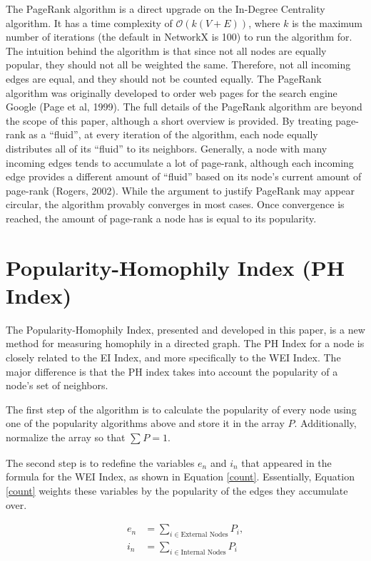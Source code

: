 \documentclass{article}
\begin{document}
The PageRank algorithm is a direct upgrade on the In-Degree Centrality
algorithm. It has a time complexity of
\(\mathcal{O}\left( k(V + E) \right)\), where $k$ is the maximum
number of iterations (the default in NetworkX is 100) to run the
algorithm for. The intuition behind the algorithm is that since not all
nodes are equally popular, they should not all be weighted the same.
Therefore, not all incoming edges are equal, and they should not be
counted equally. The PageRank algorithm was originally developed to
order web pages for the search engine Google (Page et al, 1999). The
full details of the PageRank algorithm are beyond the scope of this
paper, although a short overview is provided. By treating page-rank as a
``fluid'', at every iteration of the algorithm, each node equally
distributes all of its ``fluid'' to its neighbors. Generally, a node
with many incoming edges tends to accumulate a lot of page-rank,
although each incoming edge provides a different amount of ``fluid''
based on its node's current amount of page-rank (Rogers, 2002). While
the argument to justify PageRank may appear circular, the algorithm
provably converges in most cases. Once convergence is reached, the
amount of page-rank a node has is equal to its popularity.

\section{Popularity-Homophily Index (PH Index)}

The Popularity-Homophily Index, presented and developed in this paper,
is a new method for measuring homophily in a directed graph. The PH
Index for a node is closely related to the EI Index, and more
specifically to the WEI Index. The major difference is that the PH index
takes into account the popularity of a node's set of neighbors.

The first step of the algorithm is to calculate the popularity of every
node using one of the popularity algorithms above and store it in the
array \(P\). Additionally, normalize the array so that
\(\sum_{}^{}P = 1\).

The second step is to redefine the variables \(e_{n}\) and \(i_{n}\)
that appeared in the formula for the WEI Index, as shown in Equation \ref{count}.
Essentially, Equation \ref{count} weights these variables by the popularity of the
edges they accumulate over.

\begin{equation}
  \label{count}
  \begin{aligned}
    e_{n} &= \sum_{i \in \text{External\ Nodes}}^{}P_{i}, \\
    i_{n} &= \sum_{i \in \text{Internal\ Nodes}}^{}P_{i}
  \end{aligned}
\end{equation}
\end{document}
